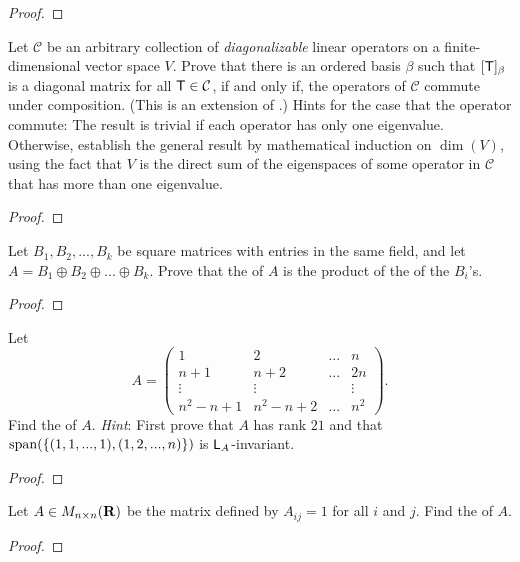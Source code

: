 \begin{proof}
\end{proof}

\begin{exercise} \label{exercise 5.4.38}
Let \(\mathcal{C}\) be an arbitrary collection of \emph{diagonalizable} linear operators on a finite-dimensional vector space \(V\).
Prove that there is an ordered basis \(\beta\) such that \([\textsf{T}]_{\beta}\) is a diagonal matrix for all \(\textsf{T} \in \mathcal{C}\), if and only if, the operators of \(\mathcal{C}\) commute under composition.
(This is an extension of .)
Hints for the case that the operator commute:
The result is trivial if each operator has only one eigenvalue.
Otherwise, establish the general result by mathematical induction on \(\dim(V)\), using the fact that \(V\) is the direct sum of the eigenspaces of some operator in \(\mathcal{C}\) that has more than one eigenvalue.
\end{exercise}

\begin{proof}
\end{proof}

\begin{exercise} \label{exercise 5.4.39}
Let \(B_1, B_2, ..., B_k\) be square matrices with entries in the same field, and let \(A = B_1 \oplus B_2 \oplus ... \oplus B_k\).
Prove that the \CPOLY{} of \(A\) is the product of the \CPOLY{} of the \(B_i\)'s.
\end{exercise}

\begin{proof}
\end{proof}

\begin{exercise} \label{exercise 5.4.40}
Let
\[
    A = \begin{pmatrix}
        1 & 2 & ... & n \\
        n + 1 & n + 2  & ... & 2n \\
        \vdots & \vdots & & \vdots \\
        n^2 - n + 1 & n^2 - n + 2 & ... & n^2
    \end{pmatrix}.
\]
Find the \CPOLY{} of \(A\).
\emph{Hint}: First prove that \(A\) has rank \(21\) and that \(\operatorname{span}(\{ (1, 1, ... , 1), (1, 2, ..., n) \})\) is \(\textsf{L}_A\)-invariant.
\end{exercise}

\begin{proof}
\end{proof}

\begin{exercise} \label{exercise 5.4.41}
Let \(A \in M_{n \times n}(\mathbf{R})\) be the matrix defined by \(A_{ij} = 1\) for all \(i\) and \(j\).
Find the \CPOLY{} of \(A\).
\end{exercise}

\begin{proof}
\end{proof}